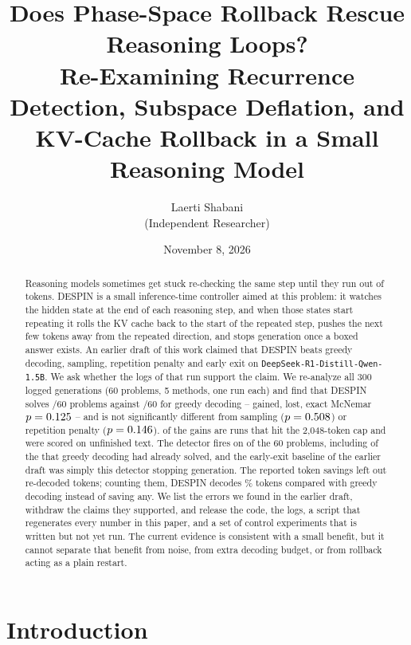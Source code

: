 \documentclass[11pt]{article}
\title{Does Phase-Space Rollback Rescue Reasoning Loops?\\
\large Re-Examining Recurrence Detection, Subspace Deflation, and KV-Cache Rollback in a Small Reasoning Model}
\author{Laerti Shabani\\ \small (Independent Researcher)}
\date{November 8, 2026}
\begin{document}
\maketitle

\begin{abstract}
Reasoning models sometimes get stuck re-checking the same step until they run out of tokens. DESPIN is a small inference-time controller aimed at this problem: it watches the hidden state at the end of each reasoning step, and when those states start repeating it rolls the KV cache back to the start of the repeated step, pushes the next few tokens away from the repeated direction, and stops generation once a boxed answer exists. An earlier draft of this work claimed that DESPIN beats greedy decoding, sampling, repetition penalty and early exit on \texttt{DeepSeek-R1-Distill-Qwen-1.5B}. We ask whether the logs of that run support the claim. We re-analyze all 300 logged generations (60 problems, 5 methods, one run each) and find that DESPIN solves \statDespinCorrect/60 problems against \statGreedyCorrect/60 for greedy decoding – \statNDespinVsGreedyOnlyMethod{} gained, \statNDespinVsGreedyOnlyGreedy{} lost, exact McNemar $p=0.125$ – and is not significantly different from sampling ($p=0.508$) or repetition penalty ($p=0.146$). \statRescueCapped{} of the \statRescueCount{} gains are runs that hit the 2{,}048-token cap and were scored on unfinished text. The detector fires on \statTrigAny{} of the 60 problems, including \statHealthyTrig{} of the \statHealthyN{} that greedy decoding had already solved, and the early-exit baseline of the earlier draft was simply this detector stopping generation. The reported token savings left out \statPrunedTotal{} re-decoded tokens; counting them, DESPIN decodes \statTotalRatio\% tokens compared with greedy decoding instead of saving any. We list the errors we found in the earlier draft, withdraw the claims they supported, and release the code, the logs, a script that regenerates every number in this paper, and a set of control experiments that is written but not yet run. The current evidence is consistent with a small benefit, but it cannot separate that benefit from noise, from extra decoding budget, or from rollback acting as a plain restart.
\end{abstract}

\section{Introduction}
\end{document}
